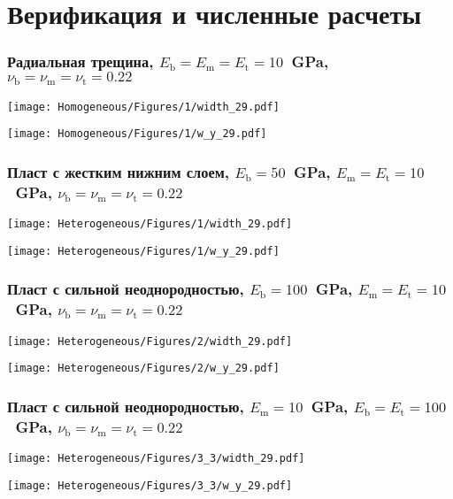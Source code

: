 \section{Верификация и численные расчеты}
\begin{frame}
    \frametitle{Радиальная трещина, $E_\text{b} = E_\text{m} = E_\text{t} = 10$~GPa, $\nu_\text{b} = \nu_\text{m} = \nu_\text{t} = 0.22$}
    \begin{minipage}[t]{0.4\linewidth}
        \texttt{[image: Homogeneous/Figures/1/width\_29.pdf]}
    \end{minipage}
    \hfill
    \begin{minipage}[t]{0.57\linewidth}
        \texttt{[image: Homogeneous/Figures/1/w\_y\_29.pdf]}
    \end{minipage}
\end{frame}

\begin{frame}
    \frametitle{Пласт с жестким нижним слоем, $E_\text{b} = 50$~GPa, $E_\text{m} = E_\text{t} = 10$~GPa, $\nu_\text{b} = \nu_\text{m} = \nu_\text{t} = 0.22$}
    \begin{minipage}[t]{0.4\linewidth}
        \texttt{[image: Heterogeneous/Figures/1/width\_29.pdf]}
    \end{minipage}
    \hfill
    \begin{minipage}[t]{0.57\linewidth}
        \texttt{[image: Heterogeneous/Figures/1/w\_y\_29.pdf]}
    \end{minipage}
\end{frame}

\begin{frame}
    \frametitle{Пласт с сильной неоднородностью, $E_\text{b} = 100$~GPa, $E_\text{m} = E_\text{t} = 10$~GPa, $\nu_\text{b} = \nu_\text{m} = \nu_\text{t} = 0.22$}
    \begin{minipage}[t]{0.4\linewidth}
        \texttt{[image: Heterogeneous/Figures/2/width\_29.pdf]}
    \end{minipage}
    \hfill
    \begin{minipage}[t]{0.57\linewidth}
        \texttt{[image: Heterogeneous/Figures/2/w\_y\_29.pdf]}
    \end{minipage}
\end{frame}

\begin{frame}
    \frametitle{Пласт с сильной неоднородностью, $E_\text{m} = 10$~GPa, $E_\text{b} = E_\text{t} = 100$~GPa, $\nu_\text{b} = \nu_\text{m} = \nu_\text{t} = 0.22$}
    \begin{minipage}[t]{0.4\linewidth}
        \texttt{[image: Heterogeneous/Figures/3\_3/width\_29.pdf]}
    \end{minipage}
    \hfill
    \begin{minipage}[t]{0.57\linewidth}
        \texttt{[image: Heterogeneous/Figures/3\_3/w\_y\_29.pdf]}
    \end{minipage}
\end{frame}

